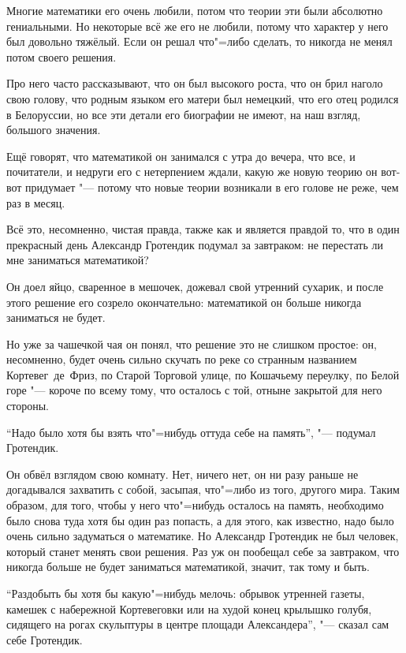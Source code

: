 Многие математики его очень любили, потом что теории эти были абсолютно
гениальными.
Но некоторые всё же его не любили, потому что характер у него был довольно
тяжёлый.
Если он решал что"=либо сделать, то никогда не менял потом своего решения.

Про него часто рассказывают, что он был высокого роста, что он брил наголо свою
голову, что родным языком его матери был немецкий, что его отец родился в
Белоруссии, но все эти детали его биографии не имеют, на наш взгляд, большого
значения.

Ещё говорят, что математикой он занимался с утра до вечера, что все, и
почитатели, и недруги его с нетерпением ждали, какую же новую теорию он вот-вот
придумает "--- потому что новые теории возникали в его голове не реже, чем раз в
месяц.

Всё это, несомненно, чистая правда, также как и является правдой то, что в один
прекрасный день Александр Гротендик подумал за завтраком:
не перестать ли мне заниматься математикой?

Он доел яйцо, сваренное в мешочек, дожевал свой утренний сухарик, и после этого
решение его созрело окончательно: математикой он больше никогда заниматься не
будет.

Но уже за чашечкой чая он понял, что решение это не слишком простое: он,
несомненно, будет очень сильно скучать по реке со странным названием
Кортевег~де~Фриз, по Старой Торговой улице, по Кошачьему переулку, по Белой горе
"--- короче по всему тому, что осталось с той, отныне закрытой для него стороны.

\enquote{Надо было хотя бы взять что"=нибудь оттуда себе на память},
"--- подумал Гротендик.

Он обвёл взглядом свою комнату.
Нет, ничего нет, он ни разу раньше не догадывался захватить с собой, засыпая,
что"=либо из того, другого мира.
Таким образом, для того, чтобы у него что"=нибудь осталось на память, необходимо
было снова туда хотя бы один раз попасть, а для этого, как известно, надо было
очень сильно задуматься о математике.
Но Александр Гротендик не был человек, который станет менять свои решения.
Раз уж он пообещал себе за завтраком, что никогда больше не будет заниматься
математикой, значит, так тому и быть.

\enquote{Раздобыть бы хотя бы какую"=нибудь мелочь: обрывок утренней газеты,
камешек с набережной Кортевеговки или на худой конец крылышко голубя, сидящего
на рогах скульптуры в центре площади Александера}, "--- сказал сам себе Гротендик.

